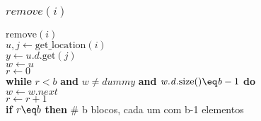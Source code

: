\documentclass{beamer}
\begin{document}
\begin{frame}[shrink]
\frametitle{$remove(i)$}
\begin{oframed}
\begin{flushleft}
\hspace*{1em} \ensuremath{\mathrm{remove}(\ensuremath{\mathit{i}})}\\

\hspace*{1em} \hspace*{1em} \ensuremath{\ensuremath{\mathit{u}}, \ensuremath{j} \gets  \ensuremath{\mathrm{get\_location}(\ensuremath{\mathit{i}})}}\\
\hspace*{1em} \hspace*{1em} \ensuremath{\ensuremath{\mathit{y}} \gets  \ensuremath{\ensuremath{\mathit{u}}.\ensuremath{\mathit{d}}.\mathrm{get}(\ensuremath{\mathit{j}})}}\\
\hspace*{1em} \hspace*{1em} \ensuremath{\ensuremath{\mathit{w}} \gets  \ensuremath{u}}\\
\hspace*{1em} \hspace*{1em} \ensuremath{\ensuremath{\mathit{r}} \gets  \ensuremath{0}}\\
\hspace*{1em} \hspace*{1em} {\color{black} \textbf{while}} \ensuremath{\ensuremath{\mathit{r}} < b} {\color{black} \textbf{and}} \ensuremath{\ensuremath{\mathit{w}} \ne dummy} {\color{black} \textbf{and}} \ensuremath{\ensuremath{\mathit{w}}.\ensuremath{\mathit{d}}.\mathrm{size}() \eq \ensuremath{\mathit{b}}-1} {\color{black} \textbf{do}} \\
\hspace*{1em} \hspace*{1em} \hspace*{1em} \ensuremath{\ensuremath{\mathit{w}} \gets  \ensuremath{\ensuremath{\mathit{w}}.next}}\\
\hspace*{1em} \hspace*{1em} \hspace*{1em} \ensuremath{\ensuremath{\mathit{r}} \gets  \ensuremath{\ensuremath{\mathit{r}} + 1}}\\
\hspace*{1em} \hspace*{1em} {\color{black} \textbf{if}} \ensuremath{\ensuremath{\mathit{r}} \eq b} {\color{black} \textbf{then}}  {\color{blue}\# b blocos, cada um com b-1 elementos}\\

\end{flushleft}
\end{oframed}
\end{frame}
\end{document}
